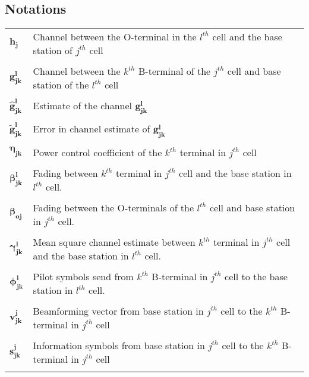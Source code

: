 \documentclass[10pt, a4paper, twoside,fleqn]{article}
\begin{document}
\begin{appendices}
\section{Notations} \label{app:notation}
\begin{flushleft}
\begin{tabular}{ll}
	$\mathbf{h_{j}}$                  & Channel between the O-terminal in the $l^{th}$ cell and the base station of $j^{th}$ cell  \\ \\ 
	$\mathbf{g_{jk}^{l}}$             & Channel between the $k^{th}$ B-terminal of the $j^{th}$ cell and base station of the $l^{th}$ cell  \\ \\
	$\mathbf{\hat g_{jk}^{l}}$        & Estimate of the channel  $\mathbf{g_{jk}^{l}}$ \\ \\
 	$\mathbf{\widetilde{g}_{jk}^{l}}$ & Error in channel estimate of $\mathbf{g_{jk}^{l}}$ \\ \\
	$\mathbf{\eta_{jk}}$              & Power control coefficient of the $k^{th}$ terminal in $j^{th}$ cell \\ \\
        $\mathbf{\beta_{jk}^{l}}$         & Fading between $k^{th}$ terminal in $j^{th}$ cell and the base station in $l^{th}$ cell. \\ \\
        $\mathbf{\beta_{oj}}$             & Fading between the O-terminals of the $l^{th}$ cell and base station in $j^{th}$ cell. \\ \\
        $\mathbf{\gamma_{jk}^{l}}$        & Mean square channel estimate between $k^{th}$ terminal in $j^{th}$ cell and the base station in $l^{th}$ cell. \\ \\
        $\mathbf{\phi_{jk}^{l}}$          & Pilot symbols send from $k^{th}$ B-terminal in $j^{th}$ cell to the base station in $l^{th}$ cell. \\ \\
        $\mathbf{v_{jk}^{j}}$             & Beamforming vector from base station in $j^{th}$ cell to the $k^{th}$ B-terminal in $j^{th}$ cell \\ \\
        $\mathbf{s_{jk}^{j}}$             & Information symbols from base station in $j^{th}$ cell to the $k^{th}$ B-terminal in $j^{th}$ cell \\ \\

\end{tabular}
\end{flushleft}
\end{appendices}
\end{document}
